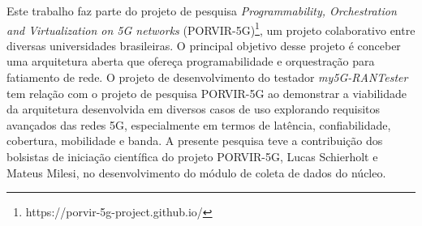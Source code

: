 Este trabalho faz parte do projeto de pesquisa \textit{Programmability, Orchestration and Virtualization on 5G networks} (PORVIR-5G)\footnote{https://porvir-5g-project.github.io/}, um projeto colaborativo entre diversas universidades brasileiras. O principal objetivo desse projeto é conceber uma arquitetura aberta que ofereça programabilidade e orquestração para fatiamento de rede.
O projeto de desenvolvimento do testador \textit{my5G-RANTester} tem relação com o projeto de pesquisa PORVIR-5G ao demonstrar a viabilidade da arquitetura desenvolvida em diversos casos de uso explorando requisitos avançados das redes 5G, especialmente em termos de latência, confiabilidade, cobertura, mobilidade e banda.
A presente pesquisa teve a contribuição dos bolsistas de iniciação científica do projeto PORVIR-5G, Lucas Schierholt e Mateus Milesi, no desenvolvimento do módulo de coleta de dados do núcleo.
